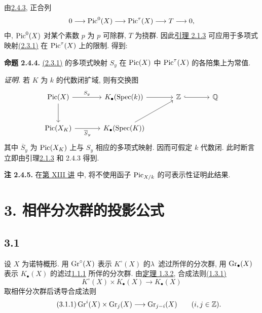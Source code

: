 由\hyperlink{sga6.e10.lem.2-4-3}{2.4.3}, 正合列
\[
0\longrightarrow\operatorname{Pic}^0(X)\longrightarrow\operatorname{Pic}^\tau(X)
\longrightarrow T\longrightarrow0,
\]
中, $\operatorname{Pic}^0(X)$ 对某个素数 $p$ 为 $p$ 可除群, $T$ 为挠群. 因此\hyperlink{sga6.e10.lem.2-1-3}{引理 2.1.3} 可应用于多项式映射\hyperlink{sga6.e10.prop.2-3-1}{(2.3.1)} 在 $\operatorname{Pic}^\tau(X)$ 上的限制. 得到:
%
%

\textbf{命题 2.4.4.} \hyperlink{sga6.e10.prop.2-3-1}{(2.3.1)} 的多项式映射 $S_y$ 在 $\operatorname{Pic}(X)$ 中 $\operatorname{Pic}^\tau(X)$ 的各陪集上为常值.
%
%

\emph{证明.} 若 $K$ 为 $k$ 的代数闭扩域, 则有交换图
%
%
\[
\begin{tikzcd}[column sep=large,row sep=large]
\Pic(X) \arrow[r,"S_y"] \arrow[d] &
K_\bullet(\Spec(k)) \arrow[r] &
\mathbb Z \arrow[r,hook] & \mathbb Q\\
\Pic(X_K) \arrow[r,"\overline S_y"'] &
K_\bullet(\Spec(K)) \arrow[ur] &&
\end{tikzcd}
\]
其中 $\overline S_y$ 为 $\operatorname{Pic}(X_K)$ 上与 $S_y$ 相应的多项式映射. 因而可假定 $k$ 代数闭. 此时断言立即由引理\hyperlink{sga6.e10.lem.2-1-3}{2.1.3} 和 2.4.3 得到.
%
%

\textbf{注 2.4.5.} 在\hyperlink{sga6.e13.expose}{第 XIII 讲} 中, 将不使用函子 $\operatorname{Pic}_{X/k}$ 的可表示性证明此结果.
%
%

\section*{3. 相伴分次群的投影公式}

\subsection*{3.1} 设 $X$ 为诺特概形. 用 $\operatorname{Gr}^{\circ}(X)$ 表示 $K^\circ(X)$ 的\mbox{$\lambda$ 滤过}所伴的分次群, 用 $\operatorname{Gr}_{\bullet}(X)$ 表示 $K_\bullet(X)$ 的滤过\hyperlink{sga6.e10.def.1-1-1}{1.1.1} 所伴的分次群. 由\hyperlink{sga6.e10.thm.1-3-2}{定理 1.3.2}, 合成法则\hyperlink{sga6.e10.eq.1-3-1}{(1.3.1)}
%
%
%
%
\[
K^\circ(X)\times K_\bullet(X)\longrightarrow K_\bullet(X)
\]
取相伴分次群后诱导合成法则
\begin{equation}\tag{3.1.1}
\operatorname{Gr}^i(X)\times\operatorname{Gr}_j(X)\longrightarrow\operatorname{Gr}_{j-i}(X)
\qquad(i,j\in\mathbb Z).
\end{equation}

